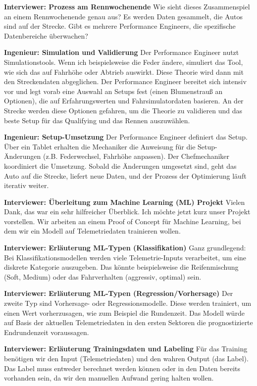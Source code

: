 \textbf{Interviewer: Prozess am Rennwochenende}
Wie sieht dieses Zusammenspiel an einem Rennwochenende genau aus? Es werden Daten gesammelt, die Autos sind auf der Strecke. Gibt es mehrere Performance Engineers, die spezifische Datenbereiche überwachen?

\textbf{Ingenieur: Simulation und Validierung}
Der Performance Engineer nutzt Simulationstools. Wenn ich beispielsweise die Feder ändere, simuliert das Tool, wie sich das auf Fahrhöhe oder Abtrieb auswirkt. Diese Theorie wird dann mit den Streckendaten abgeglichen. Der Performance Engineer bereitet sich intensiv vor und legt vorab eine Auswahl an Setups fest (einen Blumenstrauß an Optionen), die auf Erfahrungswerten und Fahrsimulatordaten basieren. An der Strecke werden diese Optionen gefahren, um die Theorie zu validieren und das beste Setup für das Qualifying und das Rennen auszuwählen.

\textbf{Ingenieur: Setup-Umsetzung}
Der Performance Engineer definiert das Setup. Über ein Tablet erhalten die Mechaniker die Anweisung für die Setup-Änderungen (z.B. Federwechsel, Fahrhöhe anpassen). Der Chefmechaniker koordiniert die Umsetzung. Sobald die Änderungen umgesetzt sind, geht das Auto auf die Strecke, liefert neue Daten, und der Prozess der Optimierung läuft iterativ weiter.

\textbf{Interviewer: Überleitung zum Machine Learning (ML) Projekt}
Vielen Dank, das war ein sehr hilfreicher Überblick. Ich möchte jetzt kurz unser Projekt vorstellen. Wir arbeiten an einem Proof of Concept für Machine Learning, bei dem wir ein Modell auf Telemetriedaten trainieren wollen.

\textbf{Interviewer: Erläuterung ML-Typen (Klassifikation)}
Ganz grundlegend: Bei Klassifikationsmodellen werden viele Telemetrie-Inputs verarbeitet, um eine diskrete Kategorie auszugeben. Das könnte beispielsweise die Reifenmischung (Soft, Medium) oder das Fahrverhalten (aggressiv, optimal) sein.

\textbf{Interviewer: Erläuterung ML-Typen (Regression/Vorhersage)}
Der zweite Typ sind Vorhersage- oder Regressionsmodelle. Diese werden trainiert, um einen Wert vorherzusagen, wie zum Beispiel die Rundenzeit. Das Modell würde auf Basis der aktuellen Telemetriedaten in den ersten Sektoren die prognostizierte Endrundenzeit voraussagen.

\textbf{Interviewer: Erläuterung Trainingsdaten und Labeling}
Für das Training benötigen wir den Input (Telemetriedaten) und den wahren Output (das Label). Das Label muss entweder berechnet werden können oder in den Daten bereits vorhanden sein, da wir den manuellen Aufwand gering halten wollen.

